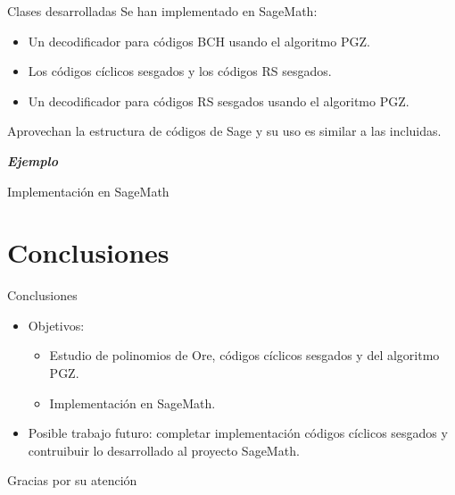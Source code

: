 \documentclass[spanish,aspectratio=169]{beamer}
\begin{document}
\begin{frame}{Clases desarrolladas}
  Se han implementado en SageMath: \begin{itemize}
    \item Un decodificador para códigos BCH usando el algoritmo PGZ.
    \item Los códigos cíclicos sesgados y los códigos RS sesgados.
    \item Un decodificador para códigos RS sesgados usando el algoritmo PGZ.
  \end{itemize}
  
  Aprovechan la estructura de códigos de Sage y su uso es similar a las incluidas.
\end{frame}

\begin{frame}
  \Huge \emph{\textbf{Ejemplo}}
  
  \LARGE Implementación en SageMath
\end{frame}

\section{Conclusiones}

\begin{frame}{Conclusiones}
  
  \begin{itemize}
    \item Objetivos:
    \begin{itemize}[label=\textcolor{green}{\faCheckSquare}]
      \item Estudio de polinomios de Ore, códigos cíclicos sesgados y del algoritmo PGZ.
      \item Implementación en SageMath.
    \end{itemize}
    \item Posible trabajo futuro: completar implementación códigos cíclicos sesgados y contruibuir lo desarrollado al proyecto SageMath.
  \end{itemize}
\end{frame}

\begin{frame}
  \Huge Gracias por su atención
\end{frame}
\end{document}
